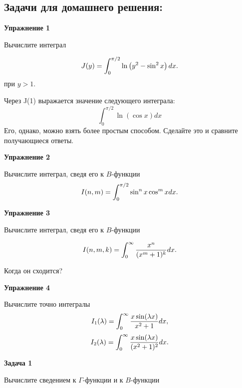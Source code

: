 \documentclass[a4paper,12pt]{article}
\begin{document}
\subsection*{Задачи для домашнего решения:}

\noindent \textbf{Упражнение 1}

\noindent Вычислите интеграл 

\begin{equation}
J(y)=\int_{0}^{\pi/2}\ln\left(y^2-\sin^2x\right)dx.\notag
\end{equation}
при $y>1$. 

\noindent
Через J(1) выражается значение следующего интеграла:
$$
\int_{0}^{\pi/2}\ln\left(\cos x\right) dx
$$
Его, однако, можно взять более простым способом. Сделайте это и сравните получающиеся ответы.

\vspace{15pt}
\noindent \textbf{Упражнение 2}

\noindent Вычислите интеграл, сведя его к $B$-функции
\begin{equation}
I(n,m)=\int_{0}^{\pi/2}\sin^{n}x\cos^{m}xdx.\notag
\end{equation}

\vspace{15pt}
\noindent \textbf{Упражнение 3}

\noindent Вычислите интеграл, сведя его к $B$-функции

\begin{equation}
I(n,m,k)	=\int_{0}^{\infty}\frac{x^{n}}{(x^{m}+1)^{k}}dx.\notag
\end{equation}

\noindent Когда он сходится?

\vspace{15pt}
\noindent \textbf{Упражнение 4}

\noindent Вычислите точно интегралы
\begin{equation}
I_{1}(\lambda)	=\int_{0}^{\infty}\frac{x\sin(\lambda x)}{x^{2}+1}dx,\notag
\end{equation}
\vspace{15pt}
\begin{equation}
I_{2}(\lambda)	=\int_{0}^{\infty}\frac{x\sin(\lambda x)}{(x^{2}+1)^{2}}dx.\notag
\end{equation}

\vspace{15pt}
\noindent \textbf{Задача 1}

\noindent Вычислите сведением к $\Gamma$-функции и к $B$-функции
\end{document}
